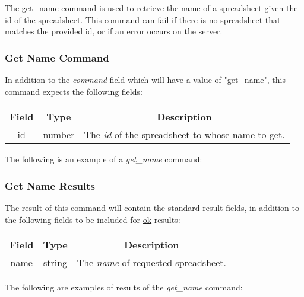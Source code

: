 The get\_name command is used to retrieve the name of a spreadsheet given the id of the spreadsheet. This command can fail if there is no spreadsheet that matches the provided id, or if an error occurs on the server.

\subsubsection{Get Name Command}

In addition to the \emph{command} field which will have a value of "get\_name", this command expects the following fields:

\begin{table}[H]
    \begin{center}
        \begin{tabular}{|c|c|c|}\hline
            Field & Type & Description \\\hline
            id & number & The \emph{id} of the spreadsheet to whose name to get. \\\hline
        \end{tabular}
    \end{center}
\end{table}

The following is an example of a \emph{get\_name} command:



\subsubsection{Get Name Results}
The result of this command will contain the \hyperref[sec:message:result]{standard result} fields, in addition to the following fields to be included for \underline{ok} results:
\begin{table}[H]
    \begin{center}
        \begin{tabular}{|c|c|c|}\hline
            Field & Type & Description \\\hline
            name & string & The \emph{name} of requested spreadsheet. \\\hline
        \end{tabular}
    \end{center}
\end{table}

The following are examples of results of the \emph{get\_name} command:




